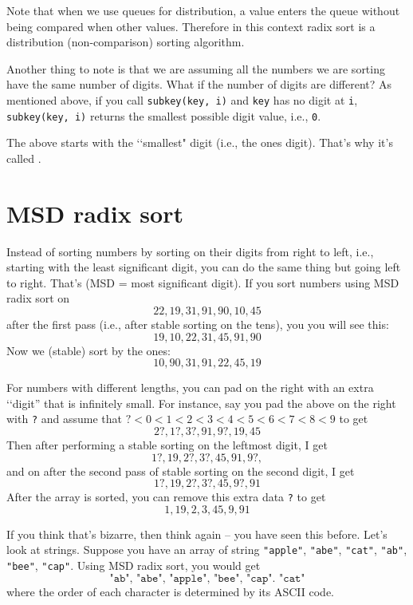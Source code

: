 Note that when we use queues for distribution, a value
enters the queue without being compared when other values.
Therefore in this context radix sort is a distribution (non-comparison) sorting
algorithm.

Another thing to note is that we are assuming all the numbers
we are sorting have the same number of digits.
What if the number of digits are different?
As mentioned above, if you call \verb!subkey(key, i)!
and \verb!key! has no digit at \verb!i!,
\verb!subkey(key, i)! returns the smallest possible digit value, i.e., \verb!0!.

The above starts with the \lq\lq smallest" digit (i.e., the ones digit).
That's why it's called .





\newpage
\section{MSD radix sort}

Instead of sorting numbers by sorting on their digits from right to left, i.e.,
starting with the least significant digit,
you can do the same thing but going left to right.
That's  (MSD = most significant digit).
If you
sort numbers using MSD
radix sort on
\[
22, 19, 31, 91, 90, 10, 45
\]
after the first pass (i.e., after stable sorting on the tens), you 
you will see this:
\[
19, 10, 22, 31, 45, 91, 90
\]
Now we (stable) sort by the ones:
\[
10, 90, 31, 91, 22, 45, 19
\]




For numbers with different lengths, you can
pad on the right with an extra \lq\lq digit'' that is infinitely small.
For instance, say you pad the above on the right with \verb!?!
and assume that $? < 0 < 1 < 2 < 3 < 4 < 5 < 6 < 7 < 8 < 9$ to get
\[
2?, 1?, 3?, 91, 9?, 19, 45
\]
Then after performing a stable sorting on the leftmost digit, I get
\[
1?, 19, 2?, 3?, 45, 91, 9?, 
\]
and on after the second pass of stable sorting on the second digit, I get
\[
1?, 19, 2?, 3?, 45, 9?, 91  
\]
After the array is sorted, you can remove this extra data \verb!?! to get
\[
1, 19, 2, 3, 45, 9, 91  
\]

If you think that's bizarre, then think again -- you have
seen this before.
Let's look at strings.
Suppose you have an array of string
\verb!"apple"!,
\verb!"abe"!,
\verb!"cat"!,
\verb!"ab"!,
\verb!"bee"!,
\verb!"cap"!.
Using MSD radix sort, you would get
\[
\texttt{"ab",
"abe",
"apple",
"bee",
"cap".
"cat"}
\]
where the order of each character is determined by its ASCII code.

